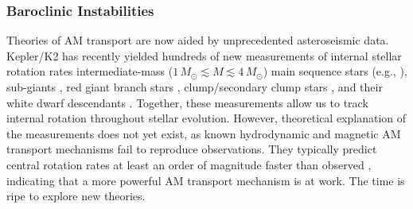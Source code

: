 \subsubsection{Baroclinic Instabilities}
\label{baroclinic}


Theories of AM transport are now aided by unprecedented asteroseismic data. Kepler/K2 has recently yielded hundreds of new measurements of internal stellar rotation rates intermediate-mass ($1 \, M_\odot \! \lesssim \! M \! \lesssim \! 4 \, M_\odot$) main sequence stars (e.g., \citealt{benomar:15,vanreeth:16}), sub-giants \citep{deheuvels:14}, red giant branch stars \citep{beck:12,mosser:12}, clump/secondary clump stars \citep{mosser:12,deheuvels:15}, and their white dwarf descendants \citep{hermes:17}. Together, these measurements allow us to track internal rotation throughout stellar evolution. However, theoretical explanation of the measurements does not yet exist, as known hydrodynamic and magnetic AM transport mechanisms fail to reproduce observations. They typically predict central rotation rates at least an order of magnitude faster than observed \citep{cantiello:14}, indicating that a more powerful AM transport mechanism is at work. The time is ripe to explore new theories.

